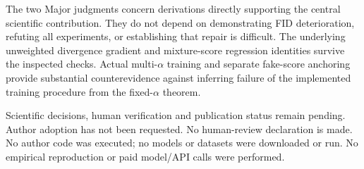 \documentclass[10pt]{article}
\begin{document}
The two Major judgments concern derivations directly supporting the central scientific contribution. They do not depend on demonstrating FID deterioration, refuting all experiments, or establishing that repair is difficult. The underlying unweighted divergence gradient and mixture-score regression identities survive the inspected checks. Actual multi-\(\alpha\) training and separate fake-score anchoring provide substantial counterevidence against inferring failure of the implemented training procedure from the fixed-\(\alpha\) theorem.\par
Scientific decisions, human verification and publication status remain pending. Author adoption has not been requested. No human-review declaration is made. No author code was executed; no models or datasets were downloaded or run. No empirical reproduction or paid model/API calls were performed.\par
\end{document}
